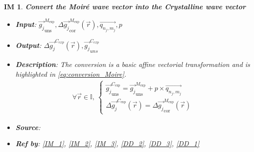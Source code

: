 \documentclass[12pt]{article}
\newtheorem{IM}{IM}
\begin{document}
\begin{IM}
\label{IM_4}
\noindent\colorbox{shadecolorIM}{\normalfont \textbf{Convert the Moir{\'e} wave 
vector into the Crystalline wave vector}}
\normalfont
\begin{itemize}
\item \textbf{Input}: 
$\overrightarrow{g_{j}}_{\text{uns}}^{M_{\text{exp}}},\Delta\overrightarrow{g_{j}}_{\text{cor}}^{M_{\text{exp}}}(\vec{r}),\overrightarrow{q_{n_j,m_j}},p$
\item \textbf{Output}: $\Delta 
\overrightarrow{g_{j}}^{C_{exp}}(\vec{r}),\overrightarrow{g_{j}}_{uns}^{C_{exp}}$
\item \textbf{Description}: The conversion is a basic affine vectorial 
transformation and is highlighted in \cref{eq:conversion_Moire}.
\begin{equation}
\label{eq:conversion_Moire}
\begin{gathered}
\forall \vec{r} \in \mathbb{I}, \ \begin{cases}
\overrightarrow{g_{j}}_{\text{uns}}^{C_{\text{exp}}}= 
\overrightarrow{g_{j}}_{\text{uns}}^{M_{\text{exp}}} + p \times 
\overrightarrow{q_{n_j,m_j}} \\
\Delta \overrightarrow{g_{j}}^{C_{\text{exp}}}(\vec{r})= 
\Delta\overrightarrow{g_{j}}_{\text{cor}}^{M_{\text{exp}}}(\vec{r})
\end{cases}
\end{gathered}
\end{equation}
\item \textbf{Source}: \cite{Pofelski2017}
\item \textbf{Ref by}: \cref{IM_1}, \cref{IM_2}, \cref{IM_3}, \cref{DD_2}, 
\cref{DD_3}, \cref{DD_1}
\end{itemize}
\end{IM}
\end{document}
